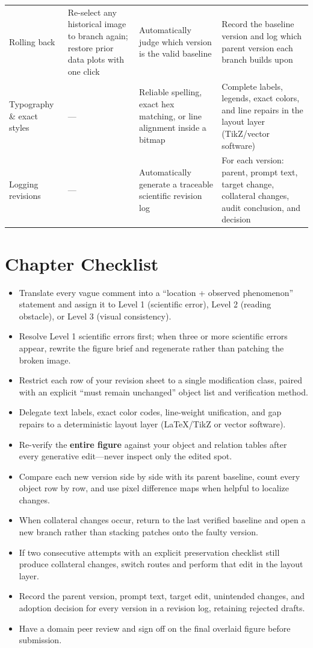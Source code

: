 \begin{table}[htbp]
\begin{tabularx}{\linewidth}{@{}>{\raggedright\arraybackslash}p{19mm}YYY@{}}
Rolling back & Re-select any historical image to branch again; restore prior data plots with one click & Automatically judge which version is the valid baseline & Record the baseline version and log which parent version each branch builds upon \\
Typography \& exact styles & --- & Reliable spelling, exact hex matching, or line alignment inside a bitmap & Complete labels, legends, exact colors, and line repairs in the layout layer (TikZ/vector software) \\
Logging revisions & --- & Automatically generate a traceable scientific revision log & For each version: parent, prompt text, target change, collateral changes, audit conclusion, and decision \\
\bottomrule
\end{tabularx}
\end{table}

\section{Chapter Checklist}

\begin{itemize}
\item Translate every vague comment into a ``location + observed phenomenon'' statement and assign it to Level 1 (scientific error), Level 2 (reading obstacle), or Level 3 (visual consistency).
\item Resolve Level 1 scientific errors first; when three or more scientific errors appear, rewrite the figure brief and regenerate rather than patching the broken image.
\item Restrict each row of your revision sheet to a single modification class, paired with an explicit ``must remain unchanged'' object list and verification method.
\item Delegate text labels, exact color codes, line-weight unification, and gap repairs to a deterministic layout layer (LaTeX/TikZ or vector software).
\item Re-verify the \textbf{entire figure} against your object and relation tables after every generative edit---never inspect only the edited spot.
\item Compare each new version side by side with its parent baseline, count every object row by row, and use pixel difference maps when helpful to localize changes.
\item When collateral changes occur, return to the last verified baseline and open a new branch rather than stacking patches onto the faulty version.
\item If two consecutive attempts with an explicit preservation checklist still produce collateral changes, switch routes and perform that edit in the layout layer.
\item Record the parent version, prompt text, target edit, unintended changes, and adoption decision for every version in a revision log, retaining rejected drafts.
\item Have a domain peer review and sign off on the final overlaid figure before submission.
\end{itemize}

